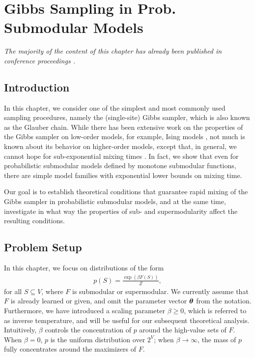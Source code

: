 \chapter{Gibbs Sampling in Prob. Submodular Models} \label{ch:gibbs}

\emph{The majority of the content of this chapter has already been published in conference proceedings \citep{gotovos15}.}

\section{Introduction}
In this chapter, we consider one of the simplest and most commonly used sampling procedures, namely the (single-site) Gibbs sampler, which is also known as the Glauber chain.
While there has been extensive work on the properties of the Gibbs sampler on low-order models, for example, Ising models \citep[Ch. 15]{levin08book}, not much is known about its behavior on higher-order models, except that, in general, we cannot hope for sub-exponential mixing times \citep{jerrum93}.
In fact, we show that even for probabilistic submodular models defined by monotone submodular functions, there are simple model families with exponential lower bounds on mixing time.

Our goal is to establish theoretical conditions that guarantee rapid mixing of the Gibbs sampler in probabilistic submodular models, and at the same time, investigate in what way the properties of sub- and supermodularity affect the resulting conditions.


\section{Problem Setup} \label{sect:setup}
In this chapter, we focus on distributions of the form
\begin{align}\label{eq:pdef}
p(S) = \frac{\exp(\beta F(S))}{Z},
\end{align}
for all $S \subseteq V$, where $F$ is submodular or supermodular.
We currently assume that $F$ is already learned or given, and omit the parameter vector $\bm{\theta}$ from the notation.
Furthermore, we have introduced a scaling parameter $\beta \geq 0$, which is referred to as inverse temperature, and will be useful for our subsequent theoretical analysis.
Intuitively, $\beta$ controls the concentration of $p$ around the high-value sets of $F$.
When $\beta = 0$, $p$ is the uniform distribution over $2^V$; when $\beta \to \infty$, the mass of $p$ fully concentrates around the maximizers of $F$.


